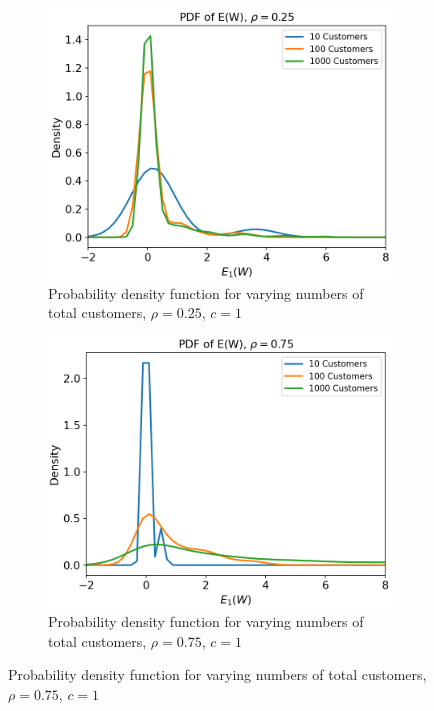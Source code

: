 \documentclass{article}
\begin{document}
    \begin{figure}[!ht]
        \centering
        \begin{subfigure}{.47\textwidth}
            \includegraphics[width=\textwidth]{pictures/part_2/pdf,025.png}
            \caption{Probability density function for varying numbers of total customers, $\rho = 0.25$, $c = 1$}
            \label{fig:pdf_1}
        \end{subfigure}
        \begin{subfigure}{.47\textwidth}
            \includegraphics[width=\textwidth]{pictures/part_2/pdf,075.png}
            \caption{Probability density function for varying numbers of total customers, $\rho = 0.75$, $c = 1$}
            \label{fig:pdf_2}
        \end{subfigure}
    \end{figure}
\end{document}
